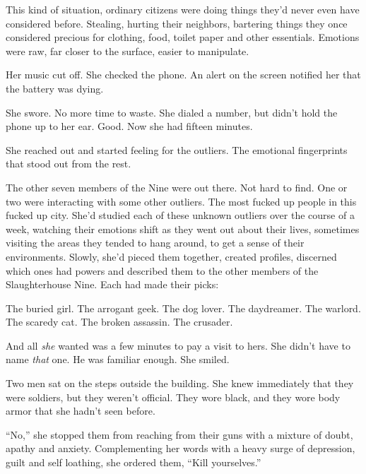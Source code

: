 This kind of situation, ordinary citizens were doing things they'd never even have considered before.  Stealing, hurting their neighbors, bartering things they once considered precious for clothing, food, toilet paper and other essentials.  Emotions were raw, far closer to the surface, easier to manipulate.



Her music cut off.  She checked the phone.  An alert on the screen notified her that the battery was dying.



She swore.  No more time to waste.  She dialed a number, but didn't hold the phone up to her ear.  Good.  Now she had fifteen minutes.



She reached out and started feeling for the outliers.  The emotional fingerprints that stood out from the rest.



The other seven members of the Nine were out there.  Not hard to find.  One or two were interacting with some other outliers.  The most fucked up people in this fucked up city.  She'd studied each of these unknown outliers over the course of a week, watching their emotions shift as they went out about their lives, sometimes visiting the areas they tended to hang around, to get a sense of their environments.  Slowly, she'd pieced them together, created profiles, discerned which ones had powers and described them to the other members of the Slaughterhouse Nine.  Each had made their picks:



The buried girl.  The arrogant geek.  The dog lover.  The daydreamer.  The warlord.  The scaredy cat.  The broken assassin.  The crusader.



And all \emph{she} wanted was a few minutes to pay a visit to hers.  She didn't have to name \emph{that} one.  He was familiar enough.  She smiled.



Two men sat on the steps outside the building.  She knew immediately that they were soldiers, but they weren't official.  They wore black, and they wore body armor that she hadn't seen before.



``No,'' she stopped them from reaching from their guns with a mixture of doubt, apathy and anxiety.  Complementing her words with a heavy surge of depression, guilt and self loathing, she ordered them, ``Kill yourselves.''



